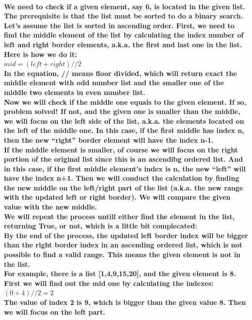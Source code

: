 \documentclass{article}
\begin{document}
\paragraph{We need to check if a given element, say 6, is located in the given list. The prerequisite is that the list must be sorted to do a binary search.\\
Let's assume the list is sorted in ascending order. First, we need to find the middle element of the list by calculating the index number of left and right border elements, a.k.a. the first and last one in the list.\\
Here is how we do it:\\
$mid=(left + right) // 2$\\
In the equation, // means floor divided, which will return exact the middle element with odd number list and the smaller one of the middle two elements in even number list.\\
Now we will check if the middle one equals to the given element. If so, problem solved! If not, and the given one is smaller than the middle, we will focus on the left side of the list, a.k.a. the elements located on the left of the middle one. 
In this case, if the first middle has index n, then the new “right” border element will have the index n-1.\\
If the middle element is smaller, of course we will focus on the right portion of the original list since this is an ascendibg ordered list. And in this case, if the first middle element's index is n, the new “left” will have the index n+1.
Then we will conduct the calculation by finding the new middle on the left/right part of the list (a.k.a. the new range with the updated left or right border). We will compare the given value with the new middle.\\
We will repeat the process untill either find the element in the list, returning True, or not, which is a little bit complecated:\\
By the end of the process, the updated left border index will be bigger than the right border index in an ascending ordered list, which is not possible to find a valid range. This means the given element is not in the list.\\
For example, there is a list [1,4,9,15,20], and the given element is 8.\\
First we will find out the mid one by calculating the indexes:\\
$(0+4) // 2 = 2$\\
 The value of index 2 is 9, which is bigger than the given value 8. Then we will focus on the left part.\\
}
\end{document}
